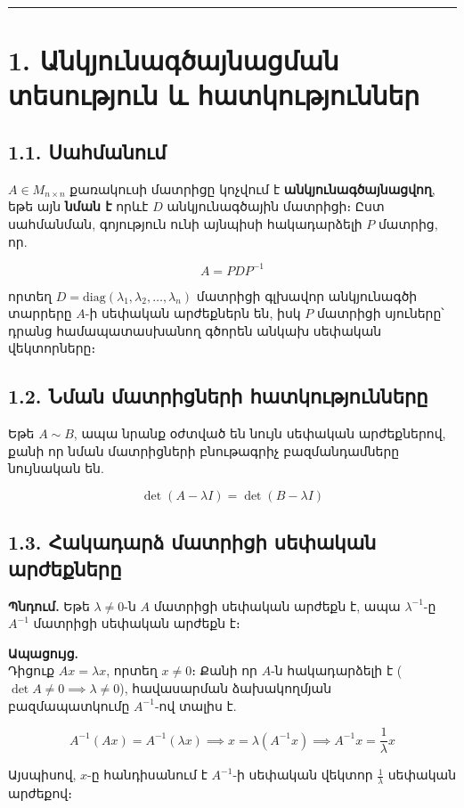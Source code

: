 \documentclass[12pt, a4paper]{article}
\begin{document}
\tableofcontents
\vspace{2em}
\hrule
\vspace{2em}

\section{1. Անկյունագծայնացման տեսություն և հատկություններ}

\subsection{1.1. Սահմանում}

$A \in M_{n \times n}$ քառակուսի մատրիցը կոչվում է \textbf{անկյունագծայնացվող}, եթե այն \textbf{նման է} որևէ $D$ անկյունագծային մատրիցի։ Ըստ սահմանման, գոյություն ունի այնպիսի հակադարձելի $P$ մատրից, որ.

$$
A = P D P^{-1}
$$

որտեղ $D = \text{diag}(\lambda_1, \lambda_2, \dots, \lambda_n)$ մատրիցի գլխավոր անկյունագծի տարրերը $A$-ի սեփական արժեքներն են, իսկ $P$ մատրիցի սյուները՝ դրանց համապատասխանող գծորեն անկախ սեփական վեկտորները։

\subsection{1.2. Նման մատրիցների հատկությունները}

Եթե $A \sim B$, ապա նրանք օժտված են նույն սեփական արժեքներով, քանի որ նման մատրիցների բնութագրիչ բազմանդամները նույնական են.

$$
\det(A - \lambda I) = \det(B - \lambda I)
$$

\subsection{1.3. Հակադարձ մատրիցի սեփական արժեքները}

\textbf{Պնդում.} Եթե $\lambda \neq 0$-ն $A$ մատրիցի սեփական արժեքն է, ապա $\lambda^{-1}$-ը $A^{-1}$ մատրիցի սեփական արժեքն է։

\textbf{Ապացույց.}\\
Դիցուք $Ax = \lambda x$, որտեղ $x \neq 0$։ Քանի որ $A$-ն հակադարձելի է ($\det A \neq 0 \implies \lambda \neq 0$), հավասարման ձախակողմյան բազմապատկումը $A^{-1}$-ով տալիս է.

$$
A^{-1}(Ax) = A^{-1}(\lambda x) \implies x = \lambda (A^{-1}x) \implies A^{-1}x = \frac{1}{\lambda}x
$$

Այսպիսով, $x$-ը հանդիսանում է $A^{-1}$-ի սեփական վեկտոր $\frac{1}{\lambda}$ սեփական արժեքով։
\end{document}
